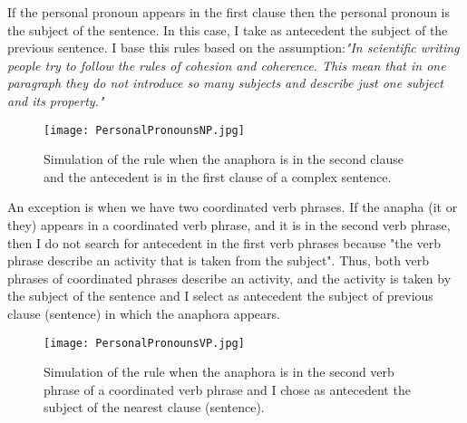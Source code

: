 If the personal pronoun appears in the first clause then the personal pronoun is the subject of the sentence. In this case, I take as antecedent the subject of the previous  sentence. I base this rules based on the assumption:\emph{"In scientific writing people try to follow the rules of cohesion and coherence. This mean that in one paragraph they do not introduce so many subjects and describe just one subject and its property."}

\begin{figure}[h]
  \begin{center}
	\texttt{[image: PersonalPronounsNP.jpg]} 
 	\caption{Simulation of  the rule when the anaphora is in the second clause and the antecedent is in the first clause of a complex sentence.}
	\label{Figure 12}
  \end{center}
\end{figure}


An exception is when we have two coordinated verb phrases. If  the anapha (it or they) appears in a coordinated verb phrase, and it is in the second verb phrase, then I do not search for antecedent in the first verb phrases because "the verb phrase describe an activity that is taken from the subject". Thus, both verb phrases of coordinated phrases describe an activity, and the activity is taken by the subject of the sentence and I select as antecedent the subject of previous clause (sentence) in which the anaphora appears. 

\begin{figure}[h]
  \begin{center}
	\texttt{[image: PersonalPronounsVP.jpg]} 
 	\caption[Caption for LOF]{Simulation of  the rule when the anaphora is in the second verb phrase of a coordinated verb phrase and I chose as antecedent the subject of the nearest clause (sentence).\footnotemark}
	\label{Figure 13}
  \end{center}
 \end{figure}
 

